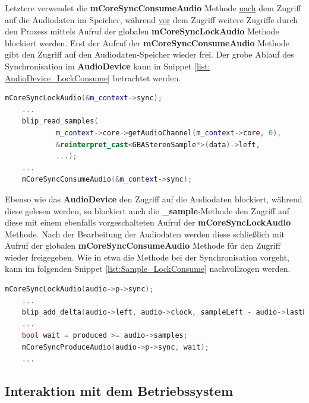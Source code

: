 \documentclass[11pt,a4paper]{scrartcl}
\begin{document}
Letztere verwendet die \textbf{mCoreSyncConsumeAudio} Methode \underline{nach} dem Zugriff auf die Audiodaten im Speicher, w\"ahrend \underline{vor} dem Zugriff weitere Zugriffe durch den Prozess mittels Aufruf der globalen \textbf{mCoreSyncLockAudio} Methode blockiert werden. Erst der Aufruf der \textbf{mCoreSyncConsumeAudio} Methode gibt den Zugriff auf den Audiodaten-Speicher wieder frei. Der grobe Ablauf des Synchronisation im \textbf{AudioDevice} kann in Snippet \ref{list: AudioDevice_LockConsume} betrachtet werden.

\vspace{5mm}
\begin{lstlisting}[language=C++, caption={AudioDevice - \enquote{Lock / Consume}}, label={list:AudioDevice_LockConsume}]
	mCoreSyncLockAudio(&m_context->sync);
	...
	blip_read_samples(
            m_context->core->getAudioChannel(m_context->core, 0),
            &reinterpret_cast<GBAStereoSample*>(data)->left,
            ...);
    ...
    mCoreSyncConsumeAudio(&m_context->sync);
\end{lstlisting}

Ebenso wie das \textbf{AudioDevice} den Zugriff auf die Audiodaten blockiert, w\"ahrend diese gelesen werden, so blockiert auch die \textbf{{\_}sample}-Methode den Zugriff auf diese mit einem ebenfalls vorgeschalteten Aufruf der \textbf{mCoreSyncLockAudio} Methode. Nach der Bearbeitung der Audiodaten werden diese schlie{\ss}lich mit Aufruf der globalen \textbf{mCoreSyncConsumeAudio} Methode f\"ur den Zugriff wieder freigegeben. Wie in etwa die Methode bei der Synchronisation vorgeht, kann im folgenden Snippet \ref{list:Sample_LockConsume} nachvollzogen werden.

\vspace{5mm}
\begin{lstlisting}[language=C++, caption={{\_}sample - \enquote{Lock / Consume}}, label={list:Sample_LockConsume}]
	mCoreSyncLockAudio(audio->p->sync);
    ...
    blip_add_delta(audio->left, audio->clock, sampleLeft - audio->lastLeft);
    ...	
	bool wait = produced >= audio->samples;
	mCoreSyncProduceAudio(audio->p->sync, wait);
	...
\end{lstlisting}



\newpage

\subsection{Interaktion mit dem Betriebssystem}
\end{document}
